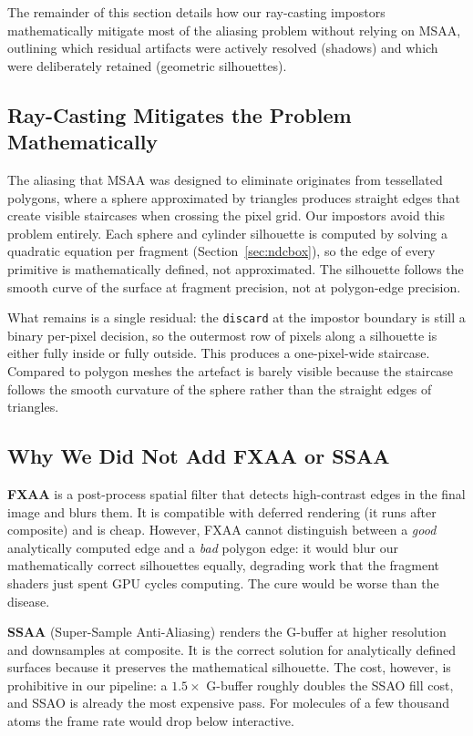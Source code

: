 \documentclass[12pt, a4paper]{article}
\begin{document}
The remainder of this section details how our ray-casting impostors mathematically mitigate most of the aliasing problem without relying on MSAA, outlining which residual artifacts were actively resolved (shadows) and which were deliberately retained (geometric silhouettes).

\subsection{Ray-Casting Mitigates the Problem Mathematically}

The aliasing that MSAA was designed to eliminate originates from tessellated polygons, where a sphere approximated by triangles produces straight edges that create visible staircases when crossing the pixel grid. Our impostors avoid this problem entirely. Each sphere and cylinder silhouette is computed by solving a quadratic equation per fragment (Section~\ref{sec:ndcbox}), so the edge of every primitive is mathematically defined, not approximated. The silhouette follows the smooth curve of the surface at fragment precision, not at polygon-edge precision.

What remains is a single residual: the \texttt{discard} at the impostor boundary is still a binary per-pixel decision, so the outermost row of pixels along a silhouette is either fully inside or fully outside. This produces a one-pixel-wide staircase. Compared to polygon meshes the artefact is barely visible because the staircase follows the smooth curvature of the sphere rather than the straight edges of triangles.

\subsection{Why We Did Not Add FXAA or SSAA}

\textbf{FXAA} is a post-process spatial filter that detects high-contrast edges in the final image and blurs them. It is compatible with deferred rendering (it runs after composite) and is cheap. However, FXAA cannot distinguish between a \emph{good} analytically computed edge and a \emph{bad} polygon edge: it would blur our mathematically correct silhouettes equally, degrading work that the fragment shaders just spent GPU cycles computing. The cure would be worse than the disease.

\textbf{SSAA} (Super-Sample Anti-Aliasing) renders the G-buffer at higher resolution and downsamples at composite. It is the correct solution for analytically defined surfaces because it preserves the mathematical silhouette. The cost, however, is prohibitive in our pipeline: a $1.5\times$ G-buffer roughly doubles the SSAO fill cost, and SSAO is already the most expensive pass. For molecules of a few thousand atoms the frame rate would drop below interactive.
\end{document}
